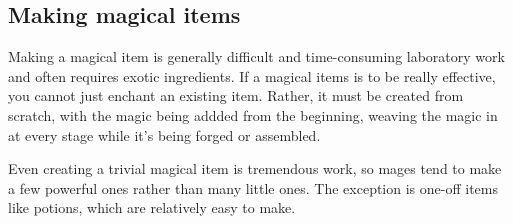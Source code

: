 \subsection{Making magical items}
Making a magical item is generally difficult and time-consuming laboratory work and often requires exotic ingredients. If a magical items is to be really effective, you cannot just enchant an existing item. Rather, it must be created from scratch, with the magic being addded from the beginning, weaving the magic in at every stage while it's being forged or assembled. 

Even creating a trivial magical item is tremendous work, so mages tend to make a few powerful ones rather than many little ones. The exception is one-off items like potions, which are relatively easy to make. 



